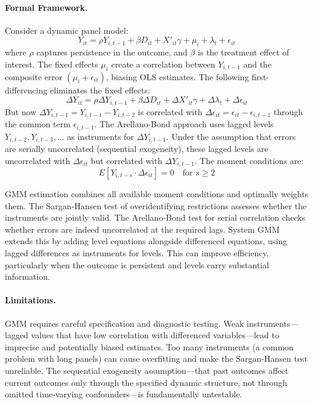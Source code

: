 \paragraph{Formal Framework.}
Consider a dynamic panel model:
\begin{equation}
\label{eq:chap2-dynamic-gmm}
    Y_{it} = \rho Y_{i,t-1} + \beta D_{it} + X'_{it}\gamma + \mu_i + \lambda_t + \epsilon_{it}
\end{equation}
where $\rho$ captures persistence in the outcome, and $\beta$ is the treatment effect of interest.
The fixed effects $\mu_i$ create a correlation between $Y_{i,t-1}$ and the composite error $(\mu_i + \epsilon_{it})$, biasing OLS estimates. The following first-differencing eliminates the fixed effects:
\begin{equation}
    \Delta Y_{it} = \rho \Delta Y_{i,t-1} + \beta \Delta D_{it} + \Delta X'_{it}\gamma + \Delta \lambda_t + \Delta \epsilon_{it}
\end{equation}
But now $\Delta Y_{i,t-1} = Y_{i,t-1} - Y_{i,t-2}$ is correlated with $\Delta \epsilon_{it} = \epsilon_{it} - \epsilon_{i,t-1}$ through the common term $\epsilon_{i,t-1}$.
The Arellano-Bond approach uses lagged levels $Y_{i,t-2}, Y_{i,t-3}, \ldots$ as instruments for $\Delta Y_{i,t-1}$.
Under the assumption that errors are serially uncorrelated (sequential exogeneity), these lagged levels are uncorrelated with $\Delta \epsilon_{it}$ but correlated with $\Delta Y_{i,t-1}$.
The moment conditions are:
\begin{equation}
    E[Y_{i,t-s} \cdot \Delta \epsilon_{it}] = 0 \quad \text{for } s \geq 2
\end{equation}

GMM estimation combines all available moment conditions and optimally weights them.
The Sargan-Hansen test of overidentifying restrictions assesses whether the instruments are jointly valid.
The Arellano-Bond test for serial correlation checks whether errors are indeed uncorrelated at the required lags.
System GMM extends this by adding level equations alongside differenced equations, using lagged differences as instruments for levels.
This can improve efficiency, particularly when the outcome is persistent and levels carry substantial information.

\paragraph{Limitations.}
GMM requires careful specification and diagnostic testing.
Weak instruments---lagged values that have low correlation with differenced variables---lead to imprecise and potentially biased estimates.
Too many instruments (a common problem with long panels) can cause overfitting and make the Sargan-Hansen test unreliable.
The sequential exogeneity assumption---that past outcomes affect current outcomes only through the specified dynamic structure, not through omitted time-varying confounders---is fundamentally untestable.

